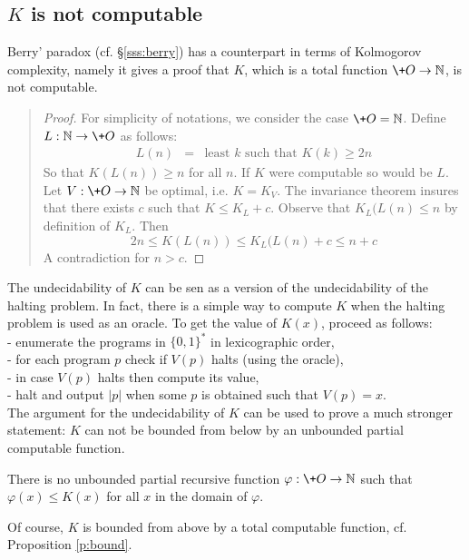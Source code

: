 \subsection{$K$ is not computable}\label{ss:Knoncomput}
Berry' paradox (cf. \S\ref{sss:berry}) has a counterpart in terms
of Kolmogorov complexity, namely it gives a proof that $K$,
which is a total function $\+O\to{\mathbb N}$, is not computable.
{\small\begin{quote}
\begin{proof}
For simplicity of notations, we consider the case $\+O={\mathbb N}$.
Define $L:{\mathbb N}\to\+O$ as follows:
\begin{eqnarray*}
L(n) &=& \mbox{least  $k$ such that $K(k)\geq 2n$}
\end{eqnarray*}
So that $K(L(n))\geq n$ for all $n$.
If $K$ were computable so would be $L$.
Let $V:\+O\to{\mathbb N}$ be optimal, i.e. $K=K_V$.
The invariance theorem insures that there exists $c$ such that
$K\leq K_L+c$. Observe that $K_L(L(n)\leq n$ by definition of
$K_L$.
Then
$$
2n \leq K(L(n)) \leq K_L(L(n)+c \leq n+c
$$
A contradiction for $n>c$.
\end{proof}
\end{quote}}
The undecidability of $K$ can be sen as a version of the
undecidability of the halting problem.
In fact, there is a simple way to compute $K$ when the halting
problem is used as an oracle.
To get the value of $K(x)$, proceed as follows:
\\\indent- enumerate the programs in ${\{0,1\}^*}$ in lexicographic
          order,
\\\indent- for each program $p$ check if $V(p)$ halts
          (using the oracle),
\\\indent- in case $V(p)$ halts then compute its value,
\\\indent- halt and output $|p|$ when some $p$ is obtained
           such that $V(p)=x$.
\medskip\\
The argument for the undecidability of $K$ can be used to prove
a much stronger statement: $K$ can not be bounded from below by
an unbounded partial computable function.
\begin{theorem}[Kolmogorov]
There is no unbounded partial recursive function
$\varphi:\+O\to{\mathbb N}$ such that $\varphi(x)\leq K(x)$ for all $x$
in the domain of $\varphi$.
\end{theorem}
Of course, $K$ is bounded from above by a total computable
function, cf. Proposition \ref{p:bound}.
